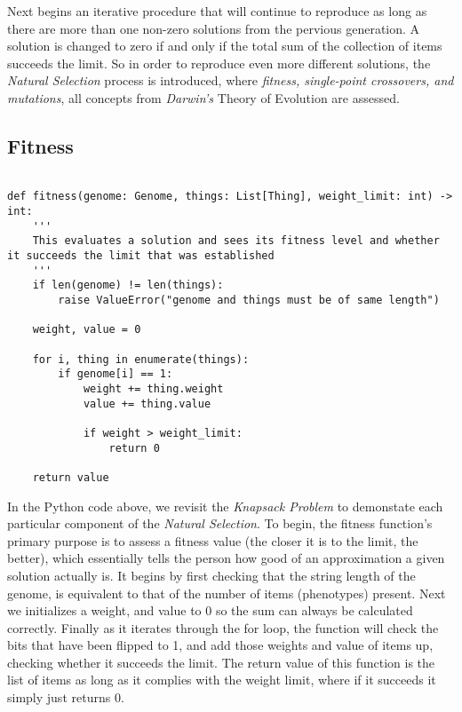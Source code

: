 Next begins an iterative procedure that will continue to reproduce as long as there are more than one non-zero solutions from the pervious generation. A solution is changed to zero if and only if the total sum of the collection of items succeeds the limit. So in order to reproduce even more different solutions, the \emph{Natural Selection} process is introduced, where \emph{fitness, single-point crossovers, and mutations}, all concepts from \emph{Darwin's} Theory of Evolution are assessed. 

\subsection{Fitness}

\begin{lstlisting}

def fitness(genome: Genome, things: List[Thing], weight_limit: int) -> int:
    '''
    This evaluates a solution and sees its fitness level and whether it succeeds the limit that was established
    '''
    if len(genome) != len(things):
        raise ValueError("genome and things must be of same length")

    weight, value = 0

    for i, thing in enumerate(things):
        if genome[i] == 1:
            weight += thing.weight
            value += thing.value

            if weight > weight_limit:
                return 0
    
    return value

\end{lstlisting}

In the Python code above, we revisit the \emph{Knapsack Problem} to demonstate each particular component of the \emph{Natural Selection}. To begin, the fitness function's primary purpose is to assess a fitness value (the closer it is to the limit, the better), which essentially tells the person how good of an approximation a given solution actually is. It begins by first checking that the string length of the genome, is equivalent to that of the number of items (phenotypes) present. Next we initializes a weight, and value to 0 so the sum can always be calculated correctly. Finally as it iterates through the for loop, the function  will check the bits that have been flipped to 1, and add those weights and value of items up, checking whether it succeeds the limit. The return value of this function is the list of items as long as it complies with the weight limit, where if it succeeds it simply just returns 0.   

